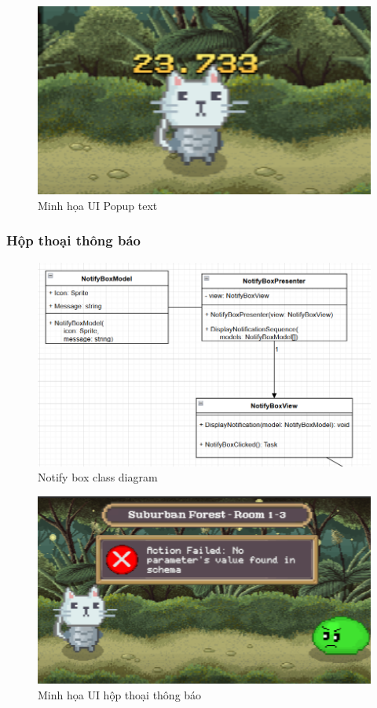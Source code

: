 \begin{figure}[H]
	\centering
	\includegraphics[width=13cm]{Images/PopupTextUI.png}
	\vspace{0.5cm}
	\caption{Minh họa UI Popup text}
\end{figure}

\subsubsection{Hộp thoại thông báo}
\begin{figure}[H]
	\centering
	\includegraphics[width=13cm]{Images/NotifyBoxView.png}
	\vspace{0.5cm}
	\caption{Notify box class diagram}
\end{figure}

\begin{figure}[H]
	\centering
	\includegraphics[width=13cm]{Images/NotifyBoxUI.png}
	\vspace{0.5cm}
	\caption{Minh họa UI hộp thoại thông báo}
\end{figure}